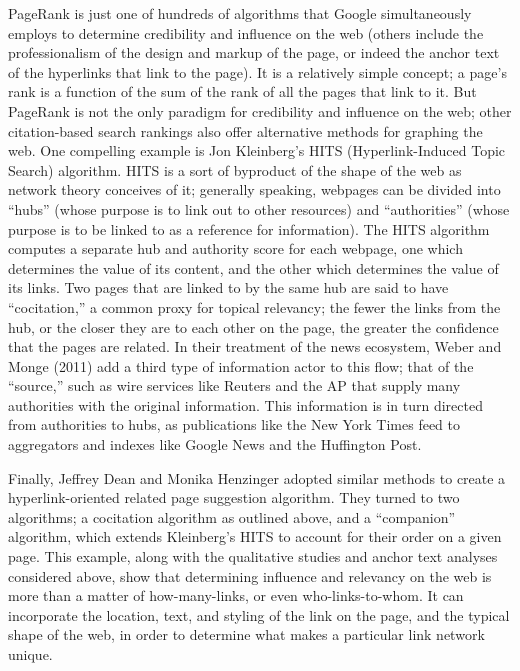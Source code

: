 PageRank is just one of hundreds of algorithms that Google simultaneously employs to determine credibility and influence on the web (others include the professionalism of the design and markup of the page, or indeed the anchor text of the hyperlinks that link to the page). It is a relatively simple concept; a page's rank is a function of the sum of the rank of all the pages that link to it. But PageRank is not the only paradigm for credibility and influence on the web; other citation-based search rankings also offer alternative methods for graphing the web. One compelling example is Jon Kleinberg's HITS (Hyperlink-Induced Topic Search) algorithm. HITS is a sort of byproduct of the shape of the web as network theory conceives of it; generally speaking, webpages can be divided into ``hubs'' (whose purpose is to link out to other resources) and ``authorities'' (whose purpose is to be linked to as a reference for information). The HITS algorithm computes a separate hub and authority score for each webpage, one which determines the value of its content, and the other which determines the value of its links. Two pages that are linked to by the same hub are said to have ``cocitation,'' a common proxy for topical relevancy; the fewer the links from the hub, or the closer they are to each other on the page, the greater the confidence that the pages are related. In their treatment of the news ecosystem, Weber and Monge (2011) add a third type of information actor to this flow; that of the ``source,'' such as wire services like Reuters and the AP that supply many authorities with the original information. This information is in turn directed from authorities to hubs, as publications like the New York Times feed to aggregators and indexes like Google News and the Huffington Post.\autocite{weber_flow_2011}

Finally, Jeffrey Dean and Monika Henzinger adopted similar methods to create a hyperlink-oriented related page suggestion algorithm. They turned to two algorithms; a cocitation algorithm as outlined above, and a ``companion'' algorithm, which extends Kleinberg's HITS to account for their order on a given page.\autocite{dean_finding_1999} This example, along with the qualitative studies and anchor text analyses considered above, show that determining influence and relevancy on the web is more than a matter of how-many-links, or even who-links-to-whom. It can incorporate the location, text, and styling of the link on the page, and the typical shape of the web, in order to determine what makes a particular link network unique.

